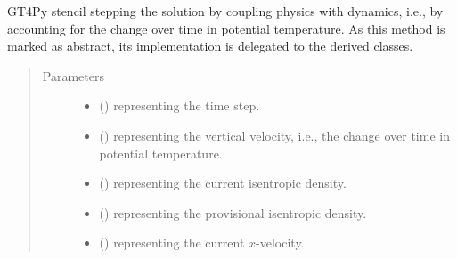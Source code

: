 \documentclass[letterpaper,10pt,english]{sphinxmanual}
\begin{document}
\begin{fulllineitems}
\begin{fulllineitems}
\end{fulllineitems}


\begin{fulllineitems}
\label{\detokenize{api:dycore.prognostic_isentropic_nonconservative.PrognosticIsentropicNonconservative._stencil_stepping_by_coupling_physics_with_dynamics_defs}}
GT4Py stencil stepping the solution by coupling physics with dynamics, i.e., by accounting for the
change over time in potential temperature.
As this method is marked as abstract, its implementation is delegated to the derived classes.
\begin{quote}\begin{description}
\item[{Parameters}] \leavevmode\begin{itemize}
\item {} 
 () \textendash{}  representing the time step.

\item {} 
 () \textendash{}  representing the vertical velocity, i.e., the change over time in potential temperature.

\item {} 
 () \textendash{}  representing the current isentropic density.

\item {} 
 () \textendash{}  representing the provisional isentropic density.

\item {} 
 () \textendash{}  representing the current \(x\)-velocity.


\end{itemize}
\end{description}
\end{quote}
\end{fulllineitems}
\end{fulllineitems}
\end{document}
